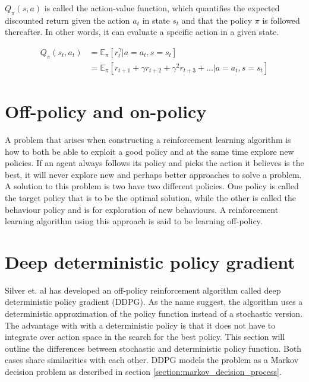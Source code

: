 \documentclass[class=book, crop=false]{standalone}
\begin{document}
$Q_{\pi}(s,a)$ is called the action-value function, which quantifies the expected discounted return given the action $a_{t}$ in state $s_{t}$ and that the policy $\pi$ is followed thereafter. In other words, it can evaluate a specific action in a given state.  

\begin{equation}
   \begin{aligned}\label{eq:theory:action_value_function}
Q_{\pi}(s_{t},a_{t}) 
&= \mathbb{E}_{\pi}[r^{\gamma}_{t}|a=a_{t} ,s=s_{t}]
\\
&= \mathbb{E}_{\pi}[ r_{t+1} + \gamma r_{t+2} + \gamma^{2} r_{t+3} + ...|a=a_{t} ,s=s_{t}]
\end{aligned} 
\end{equation}




\section{Off-policy and on-policy}
A problem that arises when constructing a reinforcement learning algorithm is how to both be able to exploit a good policy and at the same time explore new policies. If an agent always follows its policy and picks the action it believes is the best, it will never explore new and perhaps better approaches to solve a problem. A solution to this problem is two have two different policies. One policy is called the target policy that is to be the optimal solution, while the other is called the behaviour policy and is for exploration of new behaviours\cite{Sutton1998}. A reinforcement learning algorithm using this approach is said to be learning off-policy.

\section{Deep deterministic policy gradient}
Silver et. al has developed an off-policy reinforcement algorithm called deep deterministic policy gradient (DDPG)\cite{pmlr-v32-silver14}. As the name suggest, the algorithm uses a deterministic approximation of the policy function instead of a stochastic version. The advantage with with a deterministic policy is that it does not have to integrate over action space in the search for the best policy. This section will outline the differences between stochastic and deterministic policy function. Both cases share similarities with each other. DDPG models the problem as a Markov decision problem as described in section \ref{section:markov_decision_process}.
\end{document}
